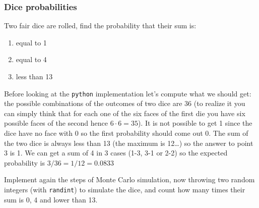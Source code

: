 \subsubsection{Dice probabilities}
Two fair dice are rolled, find the probability that their sum is:
\begin{enumerate}
\item equal to 1
\item equal to 4
\item less than 13
\end{enumerate}

Before looking at the \texttt{python} implementation let's compute what we should get: the possible combinations
of the outcomes of two dice are 36 (to realize it you can simply think that for each one of the six faces of the first die you have six possible faces of the second hence $6\cdot 6=35$). It is not possible to get 1 since
the dice have no face with 0 so the first probability should come out 0. The sum of the two dice is always less than 13 
(the maximum is 12\ldots) so the answer to point 3 is 1. We can get a sum of 4 in 3 cases (1-3, 3-1 or 2-2) so the expected probability is $3/36=1/12=0.0833$

Implement again the steps of Monte Carlo simulation, now throwing two random integers (with \texttt{randint}) to simulate the dice, and count how many times their sum is 0, 4 and lower than 13.

